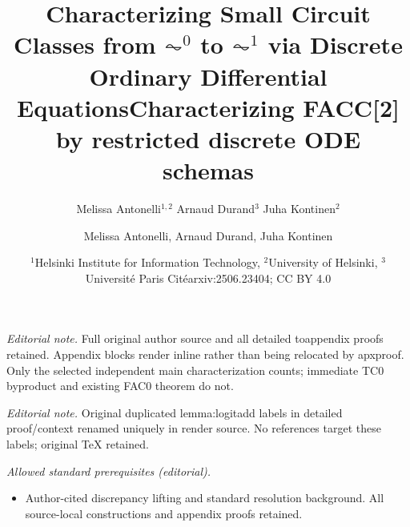 \documentclass[11pt, oneside]{article}
\title{Characterizing Small Circuit Classes from $\AC^0$ to $\AC^1$ via Discrete Ordinary Differential Equations}
\author{Melissa Antonelli$^{1,2}$ \quad Arnaud Durand$^3$ \quad Juha Kontinen$^2$}
\date{\small{$^1$Helsinki Institute for Information Technology, $^2$University of Helsinki, $^3$Universit\'e Paris Cit\'e}}
\title{Characterizing FACC[2] by restricted discrete ODE schemas}
\author{Melissa Antonelli, Arnaud Durand, Juha Kontinen}
\date{arxiv:2506.23404; CC BY 4.0}
\theoremstyle{definition}
\begin{document}
\maketitle
\noindent\textit{Editorial note.} Full original author source and all detailed toappendix proofs retained. Appendix blocks render inline rather than being relocated by apxproof. Only the selected independent main characterization counts; immediate TC0 byproduct and existing FAC0 theorem do not.\par\medskip
\noindent\textit{Editorial note.} Original duplicated lemma:logitadd labels in detailed proof/context renamed uniquely in render source. No references target these labels; original TeX retained.\par\medskip
\noindent\textit{Allowed standard prerequisites (editorial).}\begin{itemize}
\item Author-cited discrepancy lifting and standard resolution background. All source-local constructions and appendix proofs retained.
\end{itemize}\medskip

\maketitle
\end{document}
